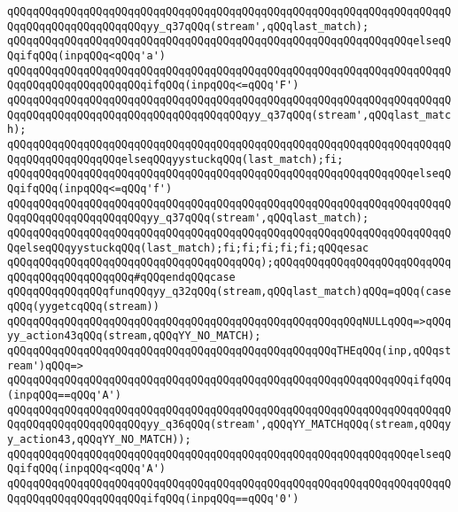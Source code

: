 \verb|qQQqqQQqqQQqqQQqqQQqqQQqqQQqqQQqqQQqqQQqqQQqqQQqqQQqqQQqqQQqqQQqqQQqqQQqqQQqqQQqqQQqqQQqqQQqyy_q37qQQq(stream',qQQqlast_match);|\newline
\verb|qQQqqQQqqQQqqQQqqQQqqQQqqQQqqQQqqQQqqQQqqQQqqQQqqQQqqQQqqQQqqQQqelseqQQqifqQQq(inpqQQq<qQQq'a')|\newline
\verb|qQQqqQQqqQQqqQQqqQQqqQQqqQQqqQQqqQQqqQQqqQQqqQQqqQQqqQQqqQQqqQQqqQQqqQQqqQQqqQQqqQQqqQQqqQQqifqQQq(inpqQQq<=qQQq'F')|\newline
\verb|qQQqqQQqqQQqqQQqqQQqqQQqqQQqqQQqqQQqqQQqqQQqqQQqqQQqqQQqqQQqqQQqqQQqqQQqqQQqqQQqqQQqqQQqqQQqqQQqqQQqqQQqqQQqyy_q37qQQq(stream',qQQqlast_match);|\newline
\verb|qQQqqQQqqQQqqQQqqQQqqQQqqQQqqQQqqQQqqQQqqQQqqQQqqQQqqQQqqQQqqQQqqQQqqQQqqQQqqQQqqQQqqQQqelseqQQqyystuckqQQq(last_match);fi;|\newline
\verb|qQQqqQQqqQQqqQQqqQQqqQQqqQQqqQQqqQQqqQQqqQQqqQQqqQQqqQQqqQQqqQQqelseqQQqifqQQq(inpqQQq<=qQQq'f')|\newline
\verb|qQQqqQQqqQQqqQQqqQQqqQQqqQQqqQQqqQQqqQQqqQQqqQQqqQQqqQQqqQQqqQQqqQQqqQQqqQQqqQQqqQQqqQQqqQQqyy_q37qQQq(stream',qQQqlast_match);|\newline
\verb|qQQqqQQqqQQqqQQqqQQqqQQqqQQqqQQqqQQqqQQqqQQqqQQqqQQqqQQqqQQqqQQqqQQqqQQqelseqQQqyystuckqQQq(last_match);fi;fi;fi;fi;fi;qQQqesac|\newline
\verb|qQQqqQQqqQQqqQQqqQQqqQQqqQQqqQQqqQQqqQQq);qQQqqQQqqQQqqQQqqQQqqQQqqQQqqQQqqQQqqQQqqQQqqQQq#qQQqendqQQqcase|\newline
\verb|qQQqqQQqqQQqqQQqfunqQQqyy_q32qQQq(stream,qQQqlast_match)qQQq=qQQq(caseqQQq(yygetcqQQq(stream))|\newline
\verb|qQQqqQQqqQQqqQQqqQQqqQQqqQQqqQQqqQQqqQQqqQQqqQQqqQQqqQQqNULLqQQq=>qQQqyy_action43qQQq(stream,qQQqYY_NO_MATCH);|\newline
\verb|qQQqqQQqqQQqqQQqqQQqqQQqqQQqqQQqqQQqqQQqqQQqqQQqqQQqTHEqQQq(inp,qQQqstream')qQQq=>|\newline
\verb|qQQqqQQqqQQqqQQqqQQqqQQqqQQqqQQqqQQqqQQqqQQqqQQqqQQqqQQqqQQqqQQqifqQQq(inpqQQq==qQQq'A')|\newline
\verb|qQQqqQQqqQQqqQQqqQQqqQQqqQQqqQQqqQQqqQQqqQQqqQQqqQQqqQQqqQQqqQQqqQQqqQQqqQQqqQQqqQQqqQQqqQQqyy_q36qQQq(stream',qQQqYY_MATCHqQQq(stream,qQQqyy_action43,qQQqYY_NO_MATCH));|\newline
\verb|qQQqqQQqqQQqqQQqqQQqqQQqqQQqqQQqqQQqqQQqqQQqqQQqqQQqqQQqqQQqqQQqelseqQQqifqQQq(inpqQQq<qQQq'A')|\newline
\verb|qQQqqQQqqQQqqQQqqQQqqQQqqQQqqQQqqQQqqQQqqQQqqQQqqQQqqQQqqQQqqQQqqQQqqQQqqQQqqQQqqQQqqQQqqQQqifqQQq(inpqQQq==qQQq'0')|\newline
